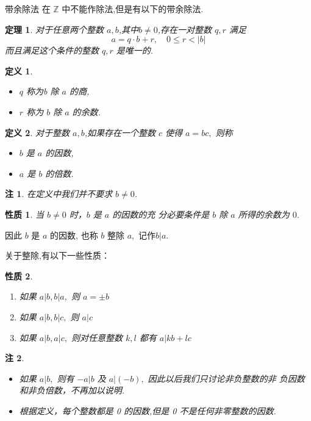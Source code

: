 \documentclass[13pt,punct]{ctexbeamer}
\newtheorem{thm}{定理}
\newtheorem*{defi}{定义}
\newtheorem*{rem}{注}
\newtheorem*{prop}{性质}
\begin{document}
\begin{frame}{带余除法}
在 $\mathbb{Z}$ 中不能作除法,但是有以下的\alert{带余除法}.
\begin{thm}
对于任意两个整数 $a ,b$,其中$b\neq 0$,存在一对整数 $q, r$ 满足
\[
a=q \cdot b+r, \quad 0 \leqslant r<|b|
\]
而且满足这个条件的整数 $q, r$ 是唯一的.
\end{thm}

\begin{defi}
\begin{itemize}
\item $q$ 称为b 除 $a$ 的\alert{商},
\item $r$ 称为 $b$ 除 $a$ 的\alert{余数}.
\end{itemize}
\end{defi}

\end{frame}



\begin{frame}
\begin{defi}
	对于整数 $a ,b$,如果存在一个整数 $c$ 使得 $a=b c,$ 则称
\begin{itemize}
\item $b$ 是 $a$ 的\alert{因数},
\item $a$ 是 $b$ 的\alert{倍数}.
\end{itemize}
\end{defi}
\begin{rem}
在定义中我们并不要求 $b\neq0$.
\end{rem}



    \begin{prop}
        当 $b\neq 0$ 时，$b$ 是 $a$ 的因数的充 分必要条件是 $b$ 除 $a$ 所得的余数为 $0$.
    \end{prop}
    因此 $b$ 是 $a$ 的因数, 也称 $b$ \alert{整除} $a,$ 记作$b | a$.

\end{frame}

\begin{frame}
关于整除,有以下一些性质：
\begin{prop}
\begin{enumerate}
\item 如果 $a|b, b| a,$ 则 $a=\pm b$
\item 如果 $a|b, b| c,$ 则 $a | c$
\item  如果 $a|b, a| c,$ 则对任意整数 $k, l$ 都有 $a | k b+l c$
\end{enumerate}
\end{prop}
\begin{rem}
\begin{itemize}
\item 如果 $a | b,$ 则有 $-a | b$ 及 $a |(-b),$ 因此以后我们只讨论\alert{非负整数}的\alert{非 负因数}和\alert{非负倍数}，不再加以说明.

\item 根据定义，每个整数都是 0 的因数,但是 0 不是任何非零整数的因数.
\end{itemize}
\end{rem}

\end{frame}
\end{document}
